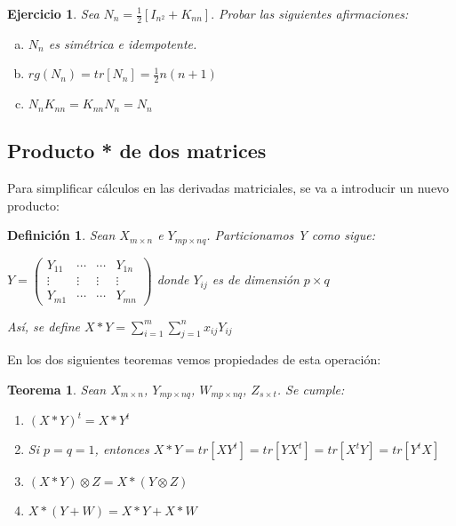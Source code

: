 \documentclass{article}
\theoremstyle{theorem-style}  %
\newtheorem{theorem}{Teorema}[section]  %
\theoremstyle{definition-style}
\newtheorem{definition}{Definición}[section]
\theoremstyle{example-style}
\theoremstyle{exercise-style}
\newtheorem{exercise}{Ejercicio}[section]
\begin{document}
	\begin{exercise}
		Sea $N_n = \frac{1}{2}[I_{n^2}+K_{nn}].$ Probar las siguientes afirmaciones:
		\begin{enumerate}[a)]
			\item $N_n$ es simétrica e idempotente.
			\item $rg(N_n) = tr[N_n] = \frac{1}{2}n(n+1)$
			\item $N_nK_{nn} = K_{nn}N_n = N_n$
		\end{enumerate}
	\end{exercise}

\newpage

\subsection{Producto * de dos matrices}
	Para simplificar cálculos en las derivadas matriciales, se va a introducir un nuevo producto: 
	
	\begin{definition}
		Sean $X_{m \times n}$ e $Y_{mp \times nq} $. Particionamos Y como sigue:
		
		$Y=\left( \begin{matrix}
		Y_{11} & \cdots & \cdots & Y_{1n}\\
		\vdots & \vdots & \vdots & \vdots \\
		Y_{m1} & \cdots & \cdots & Y_{mn} \end{matrix} \right)$ donde $Y_{ij}$ es de dimensión $p \times q$
		
		Así, se define $X*Y = \sum_{i=1}^{m}\sum_{j=1}^{n} x_{ij}Y_{ij}$ 
		
	\end{definition}

	En los dos siguientes teoremas vemos propiedades de esta operación:
	
	\begin{theorem}
		Sean $X_{m \times n}$, $Y_{mp \times nq}$, $W_{mp \times nq}$, $Z_{s \times t}$. Se cumple:
		\begin{enumerate}
			
			\item $(X*Y)^t=X*Y^t$
			
			\item Si $p=q=1$, entonces $X*Y =tr[XY^t]=tr[YX^t]=tr[X^tY]=tr[Y^tX]$
			
			\item $(X*Y) \otimes Z = X * (Y \otimes Z)$
			
			\item $X * (Y+W) = X*Y + X*W$
			
		\end{enumerate}	
	\end{theorem}
	
\end{document}
